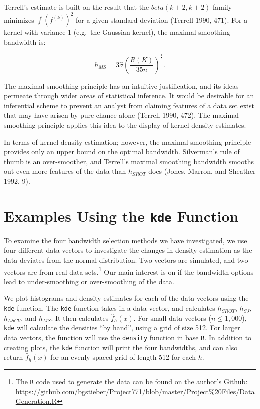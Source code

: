 \documentclass[]{article}
\let\rmarkdownfootnote\footnote%
\def\footnote{\protect\rmarkdownfootnote}
\begin{document}
Terrell's estimate is built on the result that the
\(beta(k + 2, k + 2)\) family minimizes \(\int (f^{(k)})^2\) for a given
standard deviation (Terrell 1990, 471). For a kernel with variance 1
(e.g.~the Gaussian kernel), the maximal smoothing bandwidth is:

\[
h_{MS} =  3 \hat \sigma \left(\frac{R(K)}{35 n} \right)^{\frac{1}{5}}.
\]

The maximal smoothing principle has an intuitive justification, and its
ideas permeate through wider areas of statistical inference. It would be
desirable for an inferential scheme to prevent an analyst from claiming
features of a data set exist that may have arisen by pure chance alone
(Terrell 1990, 472). The maximal smoothing principle applies this idea
to the display of kernel density estimates.

In terms of kernel density estimation; however, the maximal smoothing
principle provides only an upper bound on the optimal bandwidth.
Silverman's rule of thumb is an over-smoother, and Terrell's maximal
smoothing bandwidth smooths out even more features of the data than
\(h_{SROT}\) does (Jones, Marron, and Sheather 1992, 9).

\section{\texorpdfstring{Examples Using the \texttt{kde}
Function}{Examples Using the kde Function}}\label{examples-using-the-kde-function}

To examine the four bandwidth selection methods we have investigated, we
use four different data vectors to investigate the changes in density
estimation as the data deviates from the normal distribution. Two
vectors are simulated, and two vectors are from real data
sets.\footnote{The \texttt{R} code used to generate the data can be
  found on the author's Github:
  \url{https://github.com/bgstieber/Project771/blob/master/Project\%20Files/DataGeneration.R}}
Our main interest is on if the bandwidth options lead to under-smoothing
or over-smoothing of the data.

We plot histograms and density estimates for each of the data vectors
using the \texttt{kde} function. The \texttt{kde} function takes in a
data vector, and calculates \(h_{SROT}\), \(h_{SJ}\), \(h_{LSCV}\), and
\(h_{MS}\). It then calculates \(\widehat{f}_h(x)\). For small data
vectors (\(n \leq 1,000\)), \texttt{kde} will calculate the densities
``by hand'', using a grid of size 512. For larger data vectors, the
function will use the \texttt{density} function in base \texttt{R}. In
addition to creating plots, the \texttt{kde} function will print the
four bandwidths, and can also return \(\widehat{f}_h(x)\) for an evenly
spaced grid of length 512 for each \(h\).
\end{document}
